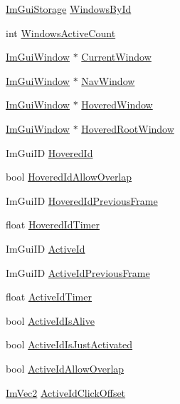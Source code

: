 \begin{DoxyCompactItemize}
\item 
\hyperlink{struct_im_gui_storage}{Im\+Gui\+Storage} \hyperlink{struct_im_gui_context_adc1e46e1c1582a0f0eb74d957efedf98}{Windows\+By\+Id}
\item 
int \hyperlink{struct_im_gui_context_a95237c5f9eb869da0f1947c54a521489}{Windows\+Active\+Count}
\item 
\hyperlink{struct_im_gui_window}{Im\+Gui\+Window} $\ast$ \hyperlink{struct_im_gui_context_aa923044f396241668aef5ed2f4c4d847}{Current\+Window}
\item 
\hyperlink{struct_im_gui_window}{Im\+Gui\+Window} $\ast$ \hyperlink{struct_im_gui_context_ae06077e45c894488b28baaf2d7ff8e41}{Nav\+Window}
\item 
\hyperlink{struct_im_gui_window}{Im\+Gui\+Window} $\ast$ \hyperlink{struct_im_gui_context_a6dd89693704216a036d2676b8c6610f8}{Hovered\+Window}
\item 
\hyperlink{struct_im_gui_window}{Im\+Gui\+Window} $\ast$ \hyperlink{struct_im_gui_context_ae5dcb8bed41ff948af2cfba6c9ae36d9}{Hovered\+Root\+Window}
\item 
Im\+Gui\+ID \hyperlink{struct_im_gui_context_a32bef5a7740179ad8076643b001f15e4}{Hovered\+Id}
\item 
bool \hyperlink{struct_im_gui_context_a171f67ac705994d413a0bccf491aa4e1}{Hovered\+Id\+Allow\+Overlap}
\item 
Im\+Gui\+ID \hyperlink{struct_im_gui_context_a08742c14087e26304ff47fb9212d8eb6}{Hovered\+Id\+Previous\+Frame}
\item 
float \hyperlink{struct_im_gui_context_a07a6bd929503077394ea0f80965470f9}{Hovered\+Id\+Timer}
\item 
Im\+Gui\+ID \hyperlink{struct_im_gui_context_a11c874eb6cf74ba9162bd1d01c4ccbcc}{Active\+Id}
\item 
Im\+Gui\+ID \hyperlink{struct_im_gui_context_af58aa479f6c97819694f1709b62c70d8}{Active\+Id\+Previous\+Frame}
\item 
float \hyperlink{struct_im_gui_context_a9deb2b22abfb5a4fd306371b19e2b9c4}{Active\+Id\+Timer}
\item 
bool \hyperlink{struct_im_gui_context_a3b28802a3a394f032264d36d5a5a00e0}{Active\+Id\+Is\+Alive}
\item 
bool \hyperlink{struct_im_gui_context_aa539096bf2b0ab28e0dbf73d595c64d8}{Active\+Id\+Is\+Just\+Activated}
\item 
bool \hyperlink{struct_im_gui_context_ab3234556023eabcfed157b79ba4c5869}{Active\+Id\+Allow\+Overlap}
\item 
\hyperlink{struct_im_vec2}{Im\+Vec2} \hyperlink{struct_im_gui_context_a28afb4e9b4ac155825f4b4c94cdc516c}{Active\+Id\+Click\+Offset}

\end{DoxyCompactItemize}
